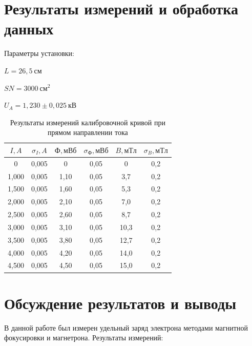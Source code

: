 \documentclass[a4paper, 12pt]{article}
\begin{document}
\section{Результаты измерений и обработка данных}

Параметры установки:
\begin{description}
\item{} $L = 26,5~см$
\item{} $SN = 3000~см^2$
\item{} $U_A = 1,230\pm0,025~кВ$
\end{description}

\begin{table}[h!]
\begin{center}
\begin{tabular}{|c|c|c|c|c|c|}
\hline
$I, A$ & $\sigma_{I}, A$ & $Ф, мВб$ & $\sigma_{Ф}, мВб$ & $B, мТл$ & $\sigma_{B}, мТл$ \\ \hline
0      & 0,005   & 0        & 0,05      & 0        & 0,2       \\ \hline
1,000  & 0,005   & 1,10     & 0,05      & 3,7      & 0,2       \\ \hline
1,500  & 0,005   & 1,60     & 0,05      & 5,3      & 0,2       \\ \hline
2,000  & 0,005   & 2,10     & 0,05      & 7,0      & 0,2       \\ \hline
2,500  & 0,005   & 2,60     & 0,05      & 8,7      & 0,2       \\ \hline
3,000  & 0,005   & 3,10     & 0,05      & 10,3     & 0,2       \\ \hline
3,500  & 0,005   & 3,80     & 0,05      & 12,7     & 0,2       \\ \hline
4,000  & 0,005   & 4,20     & 0,05      & 14,0     & 0,2       \\ \hline
4,500  & 0,005   & 4,50     & 0,05      & 15,0     & 0,2       \\ \hline
\end{tabular}
\end{center}
\caption{Результаты измерений калибровочной кривой при прямом направлении тока}
\label{tab1}
\end{table}

\section{Обсуждение результатов и выводы}

В данной работе был измерен удельный заряд электрона методами магнитной фокусировки и магнетрона. Результаты измерений:
\end{document}
